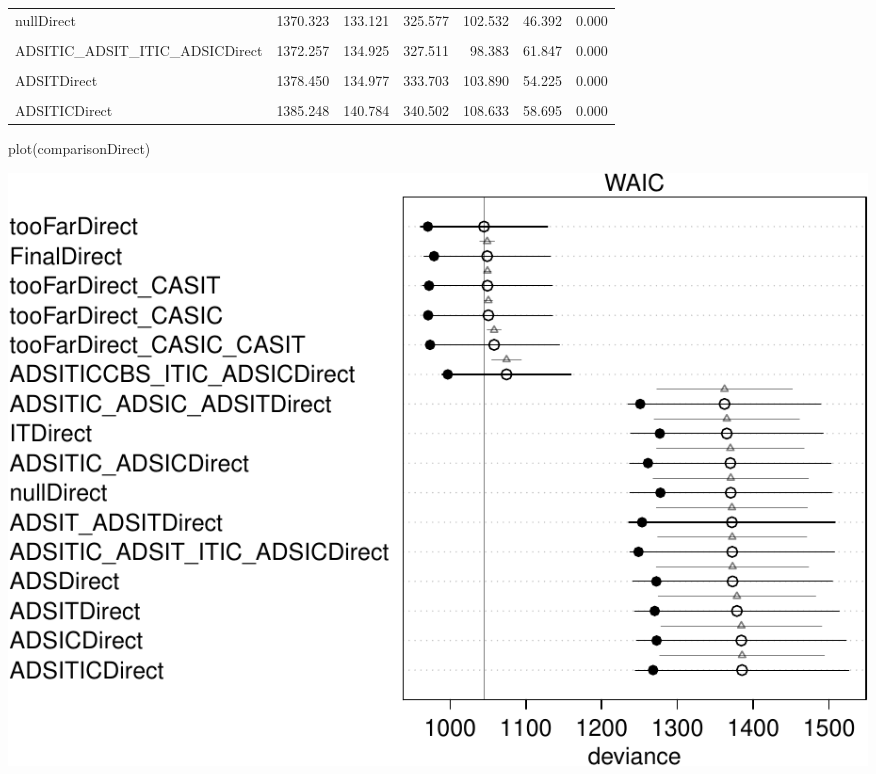 \documentclass[
  10pt,
  dvipsnames,enabledeprecatedfontcommands]{scrartcl}
\newenvironment{Shaded}{\begin{snugshade}}{\end{snugshade}}
\newcommand{\FunctionTok}[1]{\textcolor[rgb]{0.00,0.00,0.00}{#1}}
\newcommand{\NormalTok}[1]{#1}
\begin{document}
\begin{table}
{\begin{tabular}{lrrrrrr}
nullDirect & 1370.323 & 133.121 & 325.577 & 102.532 & 46.392 & 0.000\\
\addlinespace
\cellcolor{gray!6}{\cellcolor{gray!6}{ADSIT\_ADSITDirect}} & \cellcolor{gray!6}{\cellcolor{gray!6}{1371.846}} & \cellcolor{gray!6}{\cellcolor{gray!6}{136.213}} & \cellcolor{gray!6}{\cellcolor{gray!6}{327.100}} & \cellcolor{gray!6}{\cellcolor{gray!6}{99.520}} & \cellcolor{gray!6}{\cellcolor{gray!6}{59.273}} & \cellcolor{gray!6}{\cellcolor{gray!6}{0.000}}\\
ADSITIC\_ADSIT\_ITIC\_ADSICDirect & 1372.257 & 134.925 & 327.511 & 98.383 & 61.847 & 0.000\\
\cellcolor{gray!6}{\cellcolor{gray!6}{ADSDirect}} & \cellcolor{gray!6}{\cellcolor{gray!6}{1372.713}} & \cellcolor{gray!6}{\cellcolor{gray!6}{131.716}} & \cellcolor{gray!6}{\cellcolor{gray!6}{327.966}} & \cellcolor{gray!6}{\cellcolor{gray!6}{100.481}} & \cellcolor{gray!6}{\cellcolor{gray!6}{50.297}} & \cellcolor{gray!6}{\cellcolor{gray!6}{0.000}}\\
ADSITDirect & 1378.450 & 134.977 & 333.703 & 103.890 & 54.225 & 0.000\\
\cellcolor{gray!6}{\cellcolor{gray!6}{ADSICDirect}} & \cellcolor{gray!6}{\cellcolor{gray!6}{1384.285}} & \cellcolor{gray!6}{\cellcolor{gray!6}{138.312}} & \cellcolor{gray!6}{\cellcolor{gray!6}{339.538}} & \cellcolor{gray!6}{\cellcolor{gray!6}{106.092}} & \cellcolor{gray!6}{\cellcolor{gray!6}{55.895}} & \cellcolor{gray!6}{\cellcolor{gray!6}{0.000}}\\
\addlinespace
ADSITICDirect & 1385.248 & 140.784 & 340.502 & 108.633 & 58.695 & 0.000\\
\bottomrule
\end{tabular}}
\endgroup{}
\end{table}

\begin{Shaded}
\begin{Highlighting}[]
\FunctionTok{plot}\NormalTok{(comparisonDirect)}
\end{Highlighting}
\end{Shaded}

\begin{center}\includegraphics[width=1\linewidth]{bayesianReport3_files/figure-latex/comparisonDirectModels-1} \end{center}
\normalsize
\end{document}
